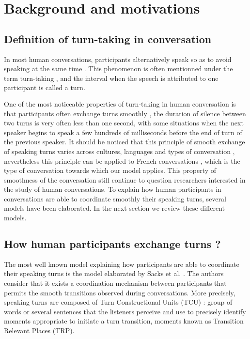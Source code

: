 
\section{Background and motivations}
\label{backgd}

\subsection{Definition of turn-taking in conversation}

In most human conversations, participants
alternatively speak so as to avoid speaking at the same
time \citep{sacks_simplest_1974}. This phenomenon is often mentionned under
the term turn-taking \citep{sacks_simplest_1974}, and the interval when
the speech is attributed to one participant is called a
turn. 

One of the most noticeable properties of turn-taking in human conversation is that participants often exchange turns
smoothly \citep{heldner_pauses_2010}, the duration of silence between two turns
is very often less than one second, with some situations
when the next speaker begins to speak a few hundreds
of milliseconds before the end of turn of the previous
speaker. It should be noticed that this principle
of smooth exchange of speaking turns varies across
cultures, languages and types of conversation \citep{oconnell_turntaking_2008,stivers_universals_2009},
nevertheless this principle can be applied
to French conversations \citep{mondada_multimodal_2007}, which is the type of
conversation towards which our model applies.
This property of smoothness of the conversation still continue to question researchers interested in the study of human conversations. To explain how human participants in conversations are able to coordinate smoothly their speaking turns, several models have been elaborated. In the next section we review these different models.

\subsection{How human participants exchange turns ?}
\label{social_psychology}

The most well known model explaining how participants are able to coordinate their speaking turns is the model elaborated by Sacks et al. \citep{sacks_simplest_1974}. The authors \citep{sacks_simplest_1974} consider that it exists a coordination
mechanism between participants that permits
the smooth transitions observed during conversations.
More precisely, speaking turns are composed of
Turn Constructional Units (TCU) : group of words or several sentences that the listeners perceive and use to precisely identify moments appropriate to initiate a turn transition, moments known as Transition Relevant Places (TRP).

